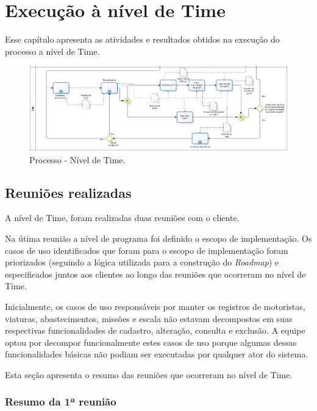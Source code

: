 \chapter{Execução à nível de Time}

  Esse capítulo apresenta as atividades e resultados obtidos na execução do processo a nível de Time.
  
  \begin{figure}[!htbp]
    \centering
    \includegraphics[scale=0.33]{figuras/processo_time}
    \caption[Processo - Nível de Time]{Processo - Nível de Time.}
    \label{processo_time}
  \end{figure}
  
  \section{Reuniões realizadas}
  
    A nível de Time, foram realizadas duas reuniões com o cliente.
    
    Na útima reunião a nível de programa foi definido o escopo de implementação.
    Os casos de uso identificados que foram para o escopo de implementação foram priorizados 
    (seguindo a lógica utilizada para a construção do \textit{Roadmap}) e especificados juntos aos clientes 
    ao longo das reuniões que ocorreram no nível de Time.
    
    Inicialmente, os casos de uso responsáveis por manter os registros de motoristas, viaturas, abastecimentos, missões e escala
    não estavam decompostos em suas respectivas funcionalidades de cadastro, alteração, consulta e exclusão. A equipe optou por 
    decompor funcionalmente estes casos de uso porque algumas dessas funcionalidades básicas não podiam ser executadas por qualquer
    ator do sistema.
    
    Esta seção apresenta o resumo das reuniões que ocorreram no nível de Time.
    
    \subsection{Resumo da 1ª reunião}
           
